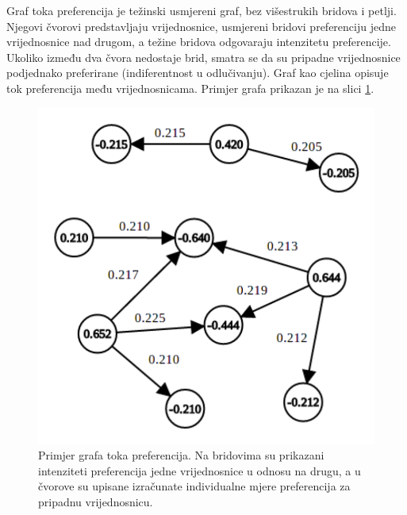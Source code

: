 \documentclass[lmodern, utf8, diplomski, numeric]{fer}
\begin{document}
  Graf toka preferencija je težinski usmjereni graf, bez višestrukih bridova i petlji.
  Njegovi čvorovi predstavljaju vrijednosnice, usmjereni bridovi preferenciju jedne vrijednosnice nad drugom, a težine bridova odgovaraju intenzitetu preferencije.
  Ukoliko između dva čvora nedostaje brid, smatra se da su pripadne vrijednosnice podjednako preferirane (indiferentnost u odlučivanju).
  Graf kao cjelina opisuje tok preferencija među vrijednosnicama.
  Primjer grafa prikazan je na slici \ref{fig:graph}.
  
  \begin{figure}[h]
    \centering
    \includegraphics[width=0.65\columnwidth]{graphics/graph.pdf}
    \caption{Primjer grafa toka preferencija. Na bridovima su prikazani intenziteti preferencija jedne vrijednosnice u odnosu na drugu, a u čvorove su upisane izračunate individualne mjere preferencija za pripadnu vrijednosnicu.}
    \label{fig:graph}
  \end{figure}
  
\end{document}
